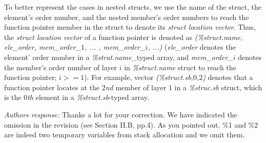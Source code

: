 \documentclass[oneside, 11pt]{article}
\begin{document}
To better represent the cases in nested structs, we use the name of the
struct, the element's order number, and the nested member's order numbers
to reach the function pointer member in the struct to denote its
\emph{struct location vector}. Thus, the \emph{struct location vector} of a
function pointer is denoted as
\emph{(\%struct.name, ele\_order, mem\_order\_$1$, ... , mem\_order\_$i$, ...)}
(\emph{ele\_order} denotes the element' order number in a \emph{\%strut.name}\_typed
array, and \emph{mem\_order\_$i$} denotes the member's order number of layer
\emph{$i$} in \emph{\%struct.name} struct to reach the function pointer; $i$$>=1$).
For example, vector \emph{(\%struct.sb,$0$,$2$)} denotes that a function pointer
locates at the \emph{$2$nd} member of layer $1$ in a \emph{\%struc.sb} struct, which
is the \emph{$0$th} element in a \emph{\%struct.sb}-typed array.



\smallskip
\smallskip
\smallskip
{}

{\em Authors response:}
Thanks a lot for your correction. We have indicated the omission in the revision
(see Section II.B, pp.4).
As you pointed out, \%1 and \%2 are indeed two temporary
variables from stack allocation and we omit them.


\smallskip
\smallskip
\smallskip
{}
\end{document}
